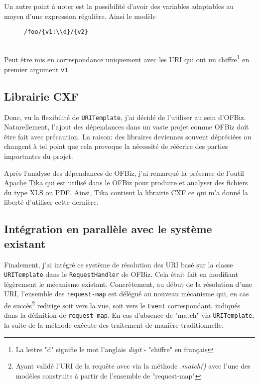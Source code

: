 Un autre point à noter est la possibilité d'avoir des variables adaptables au moyen d'une expression régulière. Ainsi le modèle 
\begin{figure}[h!]
	\begin{lstlisting}[frame=leftline]
/foo/{v1:\\d}/{v2} 
	\end{lstlisting}
\end{figure}\\
Peut être mis en correspondance uniquement avec les URI qui ont un chiffre\footnote{La lettre "d" signifie le mot l'anglais \emph{digit} - "chiffre" en français} en premier argument \verb|v1|.
\subsection{Librairie CXF}
Donc, vu la flexibilité de \verb|URITemplate|, j'ai décidé de l'utiliser au sein d'OFBiz.
Naturellement, l'ajout des dépendances dans un vaste projet comme OFBiz doit être fait avec précaution. La raison: des libraires deviennes souvent dépréciées ou changent à tel point que cela provoque la nécessité de réécrire des parties importantes du projet.  

Après l'analyse des dépendances de OFBiz, j'ai remarqué la présence  de l'outil \href{https://tika.apache.org/}{Apache Tika} qui est utilisé dans le OFBiz pour produire et analyser des fichiers du type XLS ou PDF. Ainsi, Tika contient la librairie CXF ce qui m'a donné la liberté d'utiliser cette dernière. 

\subsection{Intégration en parallèle avec le système existant}
Finalement, j'ai intégré ce système de résolution des URI basé sur la classe \verb|URITemplate| dans le \verb|RequestHandler| de OFBiz. Cela était fait en modifiant légèrement le mécanisme existant. Concrètement, au début de la résolution d'une URI, l'ensemble des \verb|request-map| est délégué au nouveau mécanisme qui, en cas de succès\footnote{ Ayant validé l'URI de la requête avec via la méthode \emph{.match()} avec l'une des modèles construits à partir de l'ensemble de  "request-map"} redirige soit vers la vue, soit vers le \verb|Event| correspondant, indiqués dans la définition de \verb|request-map|. En cas d'absence de "match" via \verb|URITemplate|, la suite de la méthode exécute des traitement de manière traditionnelle.  


